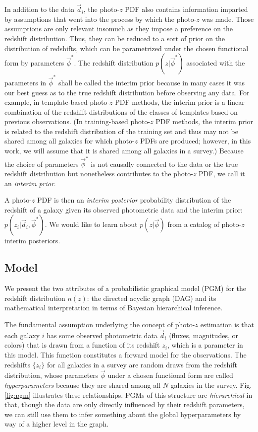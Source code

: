 \documentclass[iop]{emulateapj}
\begin{document}
In addition to the data $\vec{d}_{i}$, the photo-$z$ PDF also contains 
information imparted by assumptions that went into the process by which the 
photo-$z$ was made.  Those assumptions are only relevant insomuch as they 
impose a preference on the redshift distribution. Thus, they can be reduced to 
a sort of prior on the distribution of redshifts, which can be parametrized 
under the chosen functional form by parameters $\vec{\phi}^{*}$.  The redshift 
distribution $p(z | \vec{\phi}^{*})$ associated with the parameters in 
$\vec{\phi}^{*}$ shall be called the interim prior because in many cases it was 
our best guess as to the true redshift distribution before observing any data.  
For example, in template-based photo-$z$ PDF methods, the interim prior is a 
linear combination of the redshift distributions of the classes of templates 
based on previous observations.  (In training-based photo-$z$ PDF methods, the 
interim prior is related to the redshift distribution of the training set and 
thus may not be shared among all galaxies for which photo-$z$ PDFs are 
produced; however, in this work, we will assume that it is shared among all 
galaxies in a survey.)  Because the choice of parameters $\vec{\phi}^{*}$ is 
not causally connected to the data or the true redshift distribution but 
nonetheless contributes to the photo-$z$ PDF, we call it an \textit{interim 
prior}.  

A photo-$z$ PDF is then an \textit{interim posterior} probability distribution 
of the redshift of a galaxy given its observed photometric data and the interim 
prior: $p(z_{i} | \vec{d}_{i}, \vec{\phi}^{*})$.  We would like to learn about 
$p(z | \vec{\phi})$ from a catalog of photo-$z$ interim posteriors.

\subsection{Model}
\label{sec:model}

We present the two attributes of a probabilistic graphical model (PGM) for the 
redshift distribution $n(z)$: the directed acyclic graph (DAG) and its 
mathematical interpretation in terms of Bayesian hierarchical inference.  

The fundamental assumption underlying the concept of photo-$z$ estimation is 
that each galaxy $i$ has some observed photometric data $\vec{d}_{i}$ (fluxes, 
magnitudes, or colors) that is drawn from a function of its redshift $z_{i}$, 
which is a parameter in this model.  This function constitutes a forward model 
for the observations.  The redshifts $\{z_{i}\}$ for all galaxies in a survey 
are random draws from the redshift distribution, whose parameters  $\vec{\phi}$ 
under a chosen functional form are called \textit{hyperparameters} because they 
are shared among all $N$ galaxies in the survey.  Fig. \ref{fig:pgm} 
illustrates these relationships.  PGMs of this structure are 
\textit{hierarchical} in that, though the data are only directly influenced by 
their redshift parameters, we can still use them to infer something about the 
global hyperparameters by way of a higher level in the graph.
\end{document}
